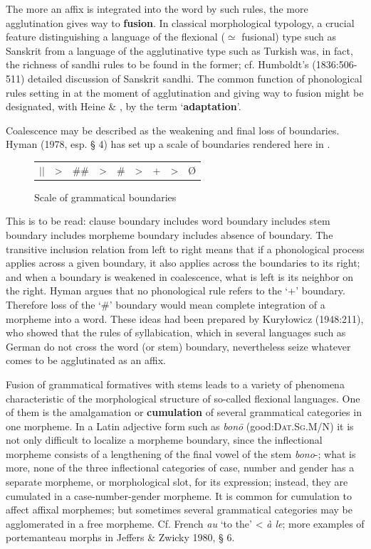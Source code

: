 The more an affix is integrated into the word by such rules, the more agglutination gives way to \textbf{fusion}. In classical morphological typology, a crucial feature distinguishing a language of the flexional (${\simeq}$ fusional) type such as Sanskrit from a language of the agglutinative type such as Turkish was, in fact, the richness of sandhi rules to be found in the former; cf. Humboldt's (1836:506-511) detailed discussion of Sanskrit sandhi. The common function of phonological rules setting in at the moment of agglutination and giving way to fusion might be designated, with Heine \& \citet[17-20]{Reh1984}, by the term ‘\textbf{adaptation}’.

Coalescence may be described as the weakening and final loss of boundaries. Hyman (1978, esp. § 4) has set up a scale of boundaries rendered here in .

\begin{figure}
\begin{tabular}{ccccccccc}
\setlength{\tabcolsep}{2em}
$||$ & {\textgreater} & \#\# & {\textgreater} & \# & {\textgreater} & + & {\textgreater} & Ø
\end{tabular}
\caption{Scale of grammatical boundaries}
\end{figure}

This is to be read: clause boundary includes word boundary includes stem boundary includes morpheme boundary includes absence of boundary. The transitive inclusion relation from left to right means that if a phonological process applies across a given boundary, it also applies across the boundaries to its right; and when a boundary is weakened in coalescence, what is left is its neighbor on the right. Hyman argues that no phonological rule refers to the ‘+’ boundary. Therefore loss of the ‘\#’ boundary would mean complete integration of a morpheme into a word. These ideas had been prepared by Kuryłowicz (1948:211), who showed that the rules of syllabication, which in several languages such as German do not cross the word (or stem) boundary, nevertheless seize whatever comes to be agglutinated as an affix.

Fusion of grammatical formatives with stems leads to a variety of phenomena characteristic of the morphological structure of so-called flexional languages. One of them is the amalgamation or \textbf{cumulation} of several grammatical categories in one morpheme. In a Latin adjective form such as \textit{bon\=o} (good:\textsc{Dat.Sg.M/N}) it is not only difficult to localize a morpheme boundary, since the inflectional morpheme consists of a lengthening of the final vowel of the stem \textit{bono}{}-; what is more, none of the three inflectional categories of case, number and gender has a separate morpheme, or morphological slot, for its expression; instead, they are cumulated in a case-number-gender morpheme. It is common for cumulation to affect affixal morphemes; but sometimes several grammatical categories may be agglomerated in a free morpheme. Cf. French \textit{au} ‘to the’ {\textless} \textit{à le}; more examples of portemanteau morphs in Jeffers \& Zwicky 1980, § 6.

